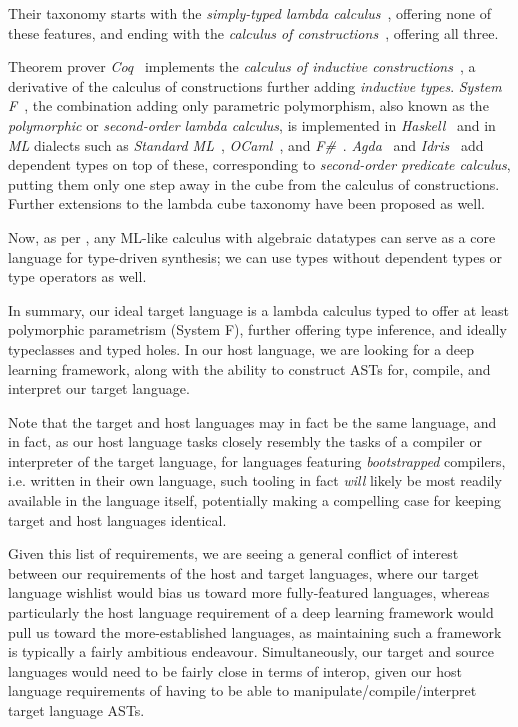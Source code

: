 \documentclass{article}
\begin{document}
Their taxonomy starts with the 
\emph{simply-typed lambda calculus}~\citep{church1940formulation},
offering none of these features,
and ending with the \emph{calculus of constructions}~\citep{coquand1986calculus},
offering all three.

Theorem prover \emph{Coq}~\citep{barras1997coq} implements the
\emph{calculus of inductive constructions}~\citep{huet1987induction},
a derivative of the calculus of constructions further adding \emph{inductive types}.
\emph{System F}~\citep{girard1971extension},
the combination adding only parametric polymorphism,
also known as the \emph{polymorphic} or \emph{second-order lambda calculus},
is implemented in \emph{Haskell}~\citep{jones2003haskell} and in
\emph{ML} dialects such as \emph{Standard ML}~\citep{harper1986standard},
\emph{OCaml}~\citep{leroy2014ocaml}, and \emph{F\#}~\citep{syme2005f}.
\emph{Agda}~\citep{norell2008dependently} and
\emph{Idris}~\citep{idris} add dependent types on top of these,
corresponding to \emph{second-order predicate calculus},
putting them only one step away in the cube from the calculus of constructions.
Further extensions to the lambda cube taxonomy have been proposed as well.%
~\citep{berardi1988towards,roorda2001pure,guallart2015overview}

Now, as per \citet{gulwani2017program},
any ML-like calculus with algebraic datatypes can serve as a core language for type-driven synthesis;
we can use types without dependent types or type operators as well.

In summary, our ideal target language is a lambda calculus
typed to offer at least polymorphic parametrism (System F),
further offering type inference, and ideally typeclasses
and typed holes.
In our host language, we are looking for a deep learning framework,
along with the ability to construct ASTs for, compile, and interpret our target language.

Note that the target and host languages may in fact be the same language,
and in fact, as our host language tasks closely resembly the
tasks of a compiler or interpreter of the target language,
for languages featuring \emph{bootstrapped} compilers,
i.e. written in their own language,
such tooling in fact \emph{will} likely be most readily available in the language itself,
potentially making a compelling case for keeping target and host languages identical.

Given this list of requirements,
we are seeing a general conflict of interest between
our requirements of the host and target languages,
where our target language wishlist would bias us toward more fully-featured languages,
whereas particularly the host language requirement of a deep learning
framework would pull us toward the more-established languages,
as maintaining such a framework is typically a fairly ambitious endeavour.
Simultaneously, our target and source languages
would need to be fairly close in terms of interop,
given our host language requirements of having to be
able to manipulate/compile/interpret target language ASTs.
\end{document}
